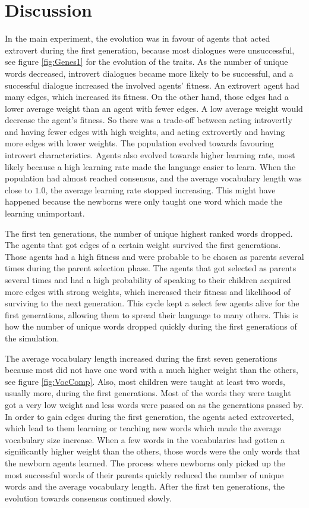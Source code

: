 \acresetall
\chapter{Discussion}
In the main experiment, the evolution was in favour of agents that acted extrovert during the first generation, because most dialogues were unsuccessful, see figure \ref{fig:Genes1} for the evolution of the traits. As the number of unique words decreased, introvert dialogues became more likely to be successful, and a successful dialogue increased the involved agents' fitness. An extrovert agent had many edges, which increased its fitness. On the other hand, those edges had a lower average weight than an agent with fewer edges. A low average weight would decrease the agent's fitness. So there was a trade-off between acting introvertly and having fewer edges with high weights, and acting extrovertly and having more edges with lower weights. The population evolved towards favouring introvert characteristics. Agents also evolved towards higher learning rate, most likely because a high learning rate made the language easier to learn. When the population had almost reached consensus, and the average vocabulary length was close to $1.0$, the average learning rate stopped increasing. This might have happened because the newborns were only taught one word which made the learning unimportant. 

The first ten generations, the number of unique highest ranked words dropped. The agents that got edges of a certain weight survived the first generations. Those agents had a high fitness and were probable to be chosen as parents several times during the parent selection phase. The agents that got selected as parents several times and had a high probability of speaking to their children acquired more edges with strong weights, which increased their fitness and likelihood of surviving to the next generation. This cycle kept a select few agents alive for the first generations, allowing them to spread their language to many others. This is how the number of unique words dropped quickly during the first generations of the simulation. 

The average vocabulary length increased during the first seven generations because most did not have one word with a much higher weight than the others, see figure \ref{fig:VocComp}. Also, most children were taught at least two words, usually more, during the first generations. Most of the words they were taught got a very low weight and less words were passed on as the generations passed by. In order to gain edges during the first generation, the agents acted extroverted, which lead to them learning or teaching new words which made the average vocabulary size increase. When a few words in the vocabularies had gotten a significantly higher weight than the others, those words were the only words that the newborn agents learned. The process where newborns only picked up the most successful words of their parents quickly reduced the number of unique words and the average vocabulary length. After the first ten generations, the evolution towards consensus continued slowly. 
 
